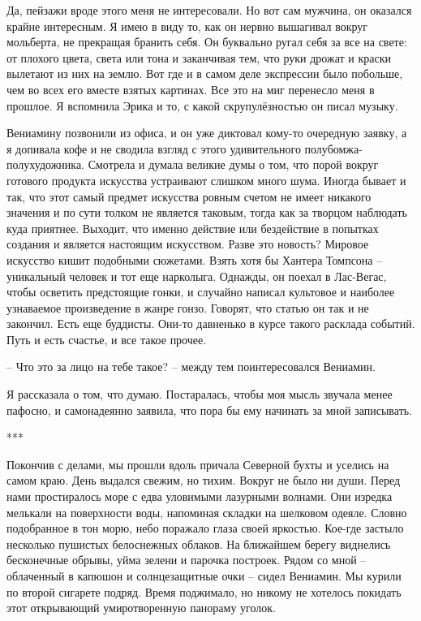 \documentclass[
]{book}
\begin{document}
Да, пейзажи вроде этого меня не интересовали. Но вот сам мужчина, он оказался крайне интересным. Я имею в виду то, как он нервно вышагивал вокруг мольберта, не прекращая бранить себя. Он буквально ругал себя за все на свете: от плохого цвета, света или тона и заканчивая тем, что руки дрожат и краски вылетают из них на землю. Вот где и в самом деле экспрессии было побольше, чем во всех его вместе взятых картинах. Все это на миг перенесло меня в прошлое. Я вспомнила Эрика и то, с какой скрупулёзностью он писал музыку.

Вениамину позвонили из офиса, и он уже диктовал кому-то очередную заявку, а я допивала кофе и не сводила взгляд с этого удивительного полубомжа-полухудожника. Смотрела и думала великие думы о том, что порой вокруг готового продукта искусства устраивают слишком много шума. Иногда бывает и так, что этот самый предмет искусства ровным счетом не имеет никакого значения и по сути толком не является таковым, тогда как за творцом наблюдать куда приятнее. Выходит, что именно действие или бездействие в попытках создания и является настоящим искусством. Разве это новость? Мировое искусство кишит подобными сюжетами. Взять хотя бы Хантера Томпсона -- уникальный человек и тот еще нарколыга. Однажды, он поехал в Лас-Вегас, чтобы осветить предстоящие гонки, и случайно написал культовое и наиболее узнаваемое произведение в жанре гонзо. Говорят, что статью он так и не закончил. Есть еще буддисты. Они-то давненько в курсе такого расклада событий. Путь и есть счастье, и все такое прочее.

-- Что это за лицо на тебе такое? -- между тем поинтересовался Вениамин.

Я рассказала о том, что думаю. Постаралась, чтобы моя мысль звучала менее пафосно, и самонадеянно заявила, что пора бы ему начинать за мной записывать.

***

Покончив с делами, мы прошли вдоль причала Северной бухты и уселись на самом краю. День выдался свежим, но тихим. Вокруг не было ни души. Перед нами простиралось море с едва уловимыми лазурными волнами. Они изредка мелькали на поверхности воды, напоминая складки на шелковом одеяле. Словно подобранное в тон морю, небо поражало глаза своей яркостью. Кое-где застыло несколько пушистых белоснежных облаков. На ближайшем берегу виднелись бесконечные обрывы, уйма зелени и парочка построек. Рядом со мной -- облаченный в капюшон и солнцезащитные очки -- сидел Вениамин. Мы курили по второй сигарете подряд. Время поджимало, но никому не хотелось покидать этот открывающий умиротворенную панораму уголок.
\end{document}
